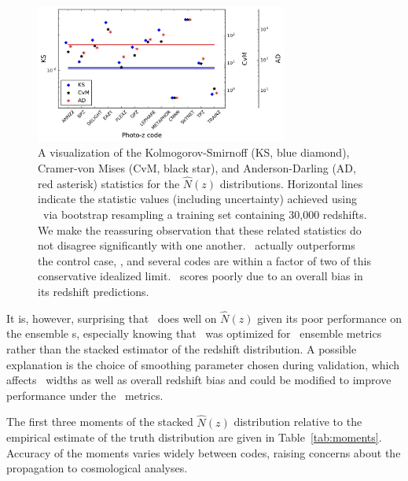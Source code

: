 \begin{figure}
\centering
\includegraphics[width=0.74\textwidth]{fig/KSvsCvMvsAD_NZ_withbootstrap.jpg}
\caption{A visualization of the Kolmogorov-Smirnoff (KS, blue diamond), Cramer-von Mises (CvM, black star), and Anderson-Darling (AD, red asterisk) statistics for the $\hat{N}(z)$ distributions.  Horizontal lines indicate the statistic values (including uncertainty) achieved using \trainz\ via bootstrap resampling a training set containing 30,000 redshifts.
We make the reassuring observation that these related statistics do not disagree significantly with one another.
\cmnn\ actually outperforms the control case, \trainz, and several codes are within a factor of two of this conservative idealized limit.  \skynet\ scores poorly due to an overall bias in its redshift predictions.}
\label{fig:nz_stats}
\end{figure}

It is, however, surprising that \tpz\ does well on $\hat{N}(z)$ given its poor performance on the ensemble \pzpdf s, especially knowing that \tpz\ was optimized for \pzpdf\ ensemble metrics rather than the stacked estimator of the redshift distribution.
A possible explanation is the choice of smoothing parameter chosen during validation, which affects \pzpdf\ widths as well as overall redshift bias and could be modified to improve performance under the \pzpdf\ metrics.

The first three moments of the stacked $\hat{N}(z)$ distribution relative to the empirical estimate of the truth distribution are given in Table~\ref{tab:moments}.
Accuracy of the moments varies widely between codes, raising concerns about the propagation to cosmological analyses.


